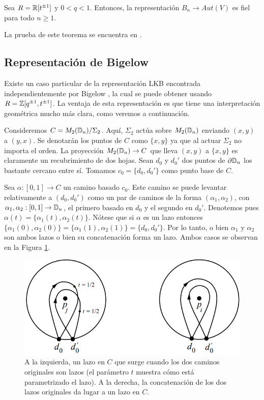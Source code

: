 \documentclass[TFG.tex]{subfiles}
\begin{document}
\begin{teorema}
Sea $R=\mathbb{R}[t^{\pm 1}]$ y $0<q<1$. Entonces, la representación $B_n\to Aut(V)$ es fiel para todo $n\geq 1$.
\end{teorema}

La prueba de este teorema se encuentra en \cite{Krammer}.


\subsection{Representación de Bigelow}
Existe un caso particular de la representación LKB encontrada independientemente por Bigelow \cite{Bil}, la cual se puede obtener usando $R=\mathbb{Z}[q^{\pm 1},t^{\pm 1}]$. La ventaja de esta representación es que tiene una interpretación geométrica mucho más clara, como veremos a continuación.

Consideremos $C=M_2(\mathbb{D}_n)/\Sigma_2$. Aquí, $\Sigma_2$ actúa sobre $M_2(\mathbb{D}_n)$ enviando $(x,y)$ a $(y,x)$. Se denotarán los puntos de $C$ como $\{x,y\}$ ya que al actuar $\Sigma_2$ no importa el orden. La proyección $M_2(\mathbb{D}_n)\to C$ que lleva $(x,y)$ a $\{x,y\}$ es claramente un recubrimiento de dos hojas. Sean $d_0$ y $d_0'$ dos puntos de $\partial\mathbb{D}_n$ los bastante cercano entre sí. Tomamos $c_0=\{d_0,d_0'\}$ como punto base de $C$.


Sea $\alpha:[0,1]\to C$ un camino basado $c_0$. Este camino se puede levantar relativamente a $(d_0,d_0')$ como un par de caminos de la forma $(\alpha_1,\alpha_2)$, con $\alpha_1,\alpha_2:[0,1]\to\mathbb{D}_n$, el primero basado en $d_0$ y el segundo en $d_0'$. Denotemos pues $\alpha(t)=\{\alpha_1(t),\alpha_2(t)\}$. Nótese que si $\alpha$ es un lazo entonces $\{\alpha_1(0),\alpha_2(0)\}=\{\alpha_1(1),\alpha_2(1)\}=\{d_0,d_0'\}$. Por lo tanto, o bien $\alpha_1$ y $\alpha_2$ son ambos lazos o bien su concatenación forma un lazo. Ambos casos se observan en la Figura \ref{loop}. 

\begin{figure}[h!]
\includegraphics[scale=0.6]{Imagenes/loop}
\caption{A la izquierda, un lazo en $C$ que surge cuando los dos caminos originales son lazos (el parámetro $t$ muestra cómo está parametrizado el lazo). A la derecha, la concatenación de los dos lazos originales da lugar a un lazo en $C$.}\label{loop}
\end{figure}
\end{document}
